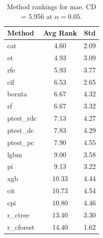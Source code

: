 \begin{table}[h]
\centering
\caption{Method rankings for mae. CD = 5.956 at $\alpha=0.05$.}
\label{tab:ranks_mae}
\begin{tabular}{lcc}
\toprule
Method & Avg Rank & Std \\
\midrule
cat & 4.60 & 2.09 \\
et & 4.93 & 3.09 \\
rfe & 5.93 & 3.77 \\
cif & 6.53 & 2.65 \\
boruta & 6.67 & 4.32 \\
rf & 6.67 & 3.32 \\
ptest_rdc & 7.13 & 4.27 \\
ptest_dc & 7.83 & 4.29 \\
ptest_pc & 7.90 & 4.55 \\
lgbm & 9.00 & 3.58 \\
pi & 9.13 & 3.22 \\
xgb & 10.33 & 4.44 \\
cit & 10.73 & 4.54 \\
cpi & 10.80 & 4.46 \\
r_ctree & 13.40 & 3.30 \\
r_cforest & 14.40 & 1.62 \\
\bottomrule
\end{tabular}
\end{table}